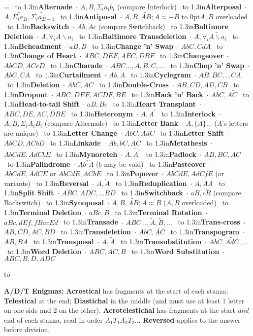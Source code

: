 \def\x#1{\ \hbox to 1.3in{\hss \bf #1}\ $\cdot$}

\voffset -0.5in
\vsize 10in
\hoffset -0.5in
\hsize 7.5in
\parindent 0pt
\nopagenumbers
\frenchspacing

=\vbox{\obeylines\parskip=4pt\hsize
  \x{Alternade} $A, B, \Sigma_ia_ib_i$ (compare Interlock)
  \x{Alterposal} $A, \widetilde{\Sigma_ia_{2i}}, \widetilde{\Sigma_ia_{2i+1}}$
  \x{Antiposal} $A, B, \widetilde{AB}; A\approx -B$ \hbox to 0pt{$A,B$ overloaded\hss}
  \x{Backswitch} $Ab, \overleftarrow A c$ (compare Switchback)
  \x{Baltimore Deletion} $A, \forall_i{A\backslash a_i}$
  \x{Baltimore Transdeletion} $A, \forall_i\widetilde{A\backslash a_i}$
  \x{Beheadment} $aB, B$
  \x{Change 'n' Swap} $AbC, CdA$
  \x{Change of Heart} $ABC, DEF, AEC, DBF$
  \x{Changeover} $AbCD, ACeD$
  \x{Charade} $ABC..., A, B, C, ...$
  \x{Chop 'n' Swap} $AbC, CA$
  \x{Curtailment} $Ab, A$
  \x{Cyclegram} $AB, BC, ... CA$
  \x{Deletion} $AbC, AC$
  \x{Double-Cross} $AB, CD, AD, CB$
  \x{Dropout} $ABC, DEF, ACDF, BE$
  \x{Hack 'n' Back} $AbC, A\overleftarrow C$
  \x{Head-to-tail Shift} $aB, Bc$
  \x{Heart Transplant} $ABC, DE, AC, DBE$
  \x{Heteronym} $A, A^\prime$
  \x{Interlock} $A, B, \Sigma_iA_iB_i$ (compare Alternade)
  \x{Letter Bank} $A, \{A\}...$ ($A$'s letters are unique)
  \x{Letter Change} $AbC, AdC$
  \x{Letter Shift} $AbCD, ACbD$
  \x{Linkade} $Ab, bC, AC$
  \x{Metathesis} $AbCdE, AdCbE$
  \x{Mynoreteh} $A, \overleftarrow{A^\prime}$
  \x{Padlock} $AB, BC, AC$
  \x{Palindrome} $Ab^?\overleftarrow A$ ($b$ may be void)
  \x{Pasteover} $AbCdE, AdCE$ or $AbCdE, ACbE$
  \x{Popover} $AbCdE, AdCfE$ (or variants)
  \x{Reversal} $A, \overleftarrow A$
  \x{Reduplication} $A, AA$
  \x{Split Shift} $ABC, ADC, ... BD$
  \x{Switchback} $aB, c\overleftarrow B$ (compare Backswitch)
  \x{Synoposal} $A, B, \widetilde{AB}; A\approx B$ ($A,B$ overloaded)
  \x{Terminal Deletion} $aBc, B$
  \x{Terminal Rotation} $aBc, dEf, fBa cEd$
  \x{Transade} $ABC..., \tilde A, \tilde B, ...$
  \x{Trans-cross} $AB, CD, AC, BD$
  \x{Transdeletion} $AbC, \widetilde{AC}$
  \x{Transpogram} $AB, BA$
  \x{Transposal} $A, \tilde A$
  \x{Transubstitution} $ AbC, \widetilde{AdC}, ...$
  \x{Word Deletion} $ABC, AC, B$
  \x{Word Substitution} $ABC, B, D, ADC$
}

\hbox to 
\parskip=4pt

{\bf A/D/T Enigmas:} {\bf Acrostical} has fragments at the start of each
stanza; {\bf Telestical} at the end; {\bf Diastichal} in the middle
(and must use at least 1 letter on one side and 2 on the other). {\bf
  Acrotelestichal} has fragments at the start {\it and} end of each
stanza, read in order $A_1T_1A_2T_2...$ {\bf Reversed} applies to the
answer before division.

